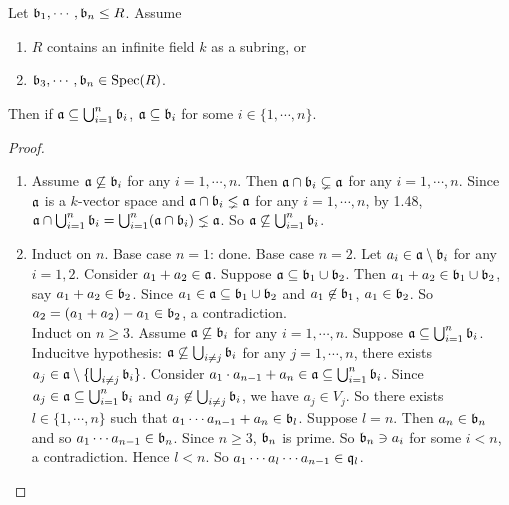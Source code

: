 \begin{theorem}
    Let $\mathfrak{b}_1,\cdots,\mathfrak{b}_n \leq R$. Assume
    \begin{enumerate}[(1)]
        \item $R$ contains an infinite field $k$ as a subring, or
        \item $\mathfrak{b}_3,\cdots,\mathfrak{b}_n \in \operatorname{Spec}(R)$.
    \end{enumerate}
    Then if $\mathfrak{a} \subseteq \bigcup_{i=1}^n \mathfrak{b}_i$, $\mathfrak{a} \subseteq \mathfrak{b}_i$ for some $i \in \{1,\cdots,n\}$.
\end{theorem}

\begin{proof}
    \begin{enumerate}[(1)]
        \item Assume $\mathfrak{a} \not \subseteq \mathfrak{b}_i$ for any $i = 1,\cdots,n$. Then $\mathfrak{a} \cap \mathfrak{b}_i \subsetneq \mathfrak{a}$ for any $i = 1,\cdots,n$. Since $\mathfrak{a}$ is a $k$-vector space and $\mathfrak{a} \cap \mathfrak{b}_i \lneq \mathfrak{a}$ for any $i = 1,\cdots,n$, by 1.48, $\mathfrak{a} \cap \bigcup_{i=1}^n \mathfrak{b}_i = \bigcup_{i=1}^n (\mathfrak{a} \cap \mathfrak{b}_i) \lneq \mathfrak{a}$. So $\mathfrak{a} \not \subseteq \bigcup_{i=1}^n \mathfrak{b}_i$. 
        \item Induct on $n$. Base case $n = 1$: done. Base case $n = 2$. Let $a_i \in \mathfrak{a} \setminus \mathfrak{b}_i$ for any $i = 1,2$. Consider $a_1 + a_2 \in \mathfrak{a}$. Suppose $\mathfrak{a} \subseteq \mathfrak{b}_1 \cup \mathfrak{b}_2$. Then $a_1 + a_2 \in \mathfrak{b}_1 \cup \mathfrak{b}_2$, say $a_1 + a_2 \in \mathfrak{b}_2$. Since $a_1 \in \mathfrak{a} \subseteq \mathfrak{b}_1 \cup \mathfrak{b}_2$ and $a_1 \not \in \mathfrak{b}_1$, $a_1 \in \mathfrak{b}_2$. So $a_2 = (a_1 + a_2) - a_1 \in \mathfrak{b}_2$, a contradiction. \\
            Induct on $n \geq 3$. Assume $\mathfrak{a} \not \subseteq \mathfrak{b}_i$ for any $i = 1,\cdots,n$. Suppose $\mathfrak{a} \subseteq \bigcup_{i=1}^n \mathfrak{b}_i$. Inducitve hypothesis: $\mathfrak{a} \not \subseteq \bigcup_{i \neq j} \mathfrak{b}_i$ for any $j = 1,\cdots,n$, there exists $a_j \in \mathfrak{a} \setminus \{\bigcup_{i \neq j} \mathfrak{b}_i\}$. Consider $a_1 \cdot a_{n-1} + a_n \in \mathfrak{a} \subseteq \bigcup_{i=1}^n \mathfrak{b}_i$. Since $a_j \in \mathfrak{a} \subseteq \bigcup_{i=1}^n \mathfrak{b}_i$ and $a_j \not \in \bigcup_{i \neq j} \mathfrak{b}_i$, we have $a_j \in V_j$. So there exists $l \in \{1,\cdots,n\}$ such that $a_1 \cdots a_{n-1} + a_n \in \mathfrak{b}_l$. Suppose $l=n$. Then $a_n \in \mathfrak{b}_n$ and so $a_1 \cdots a_{n-1} \in \mathfrak{b}_n$. Since $n \geq 3$, $\mathfrak{b}_n$ is prime. So $\mathfrak{b}_n \ni a_i$ for some $i < n$, a contradiction. Hence $l < n$. So $a_1 \cdots a_l \cdots a_{n-1} \in \mathfrak{q}_l$.
    \end{enumerate}
\end{proof}


